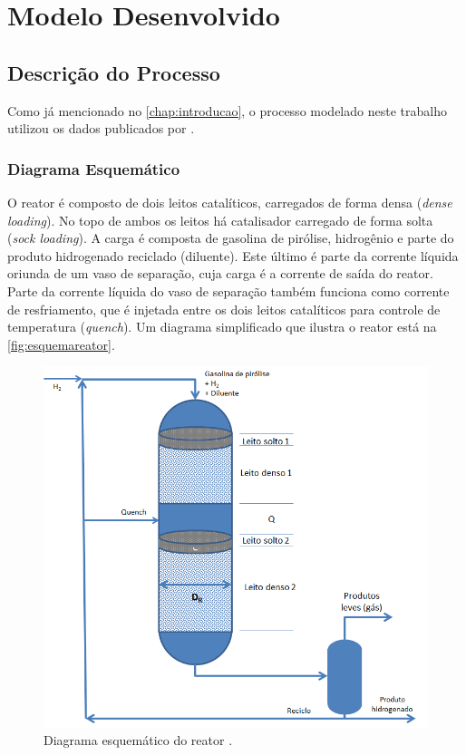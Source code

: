 %
\chapter{Modelo Desenvolvido}
\label{chap:moddesenvolvidos}

\section{Descrição do Processo} \label{sec:descricaoprocesso}

Como já mencionado no \autoref{chap:introducao}, o processo modelado
neste trabalho utilizou os dados publicados por . 

\subsection{Diagrama Esquemático} \label{sec:diagramaesquematico}

O reator é composto de dois leitos catalíticos, carregados de forma
densa (\emph{dense loading}). No topo de ambos os leitos há catalisador carregado de
forma solta (\emph{sock loading}). A carga é composta de gasolina de pirólise,
hidrogênio e parte do produto hidrogenado reciclado (diluente). Este último é
parte da corrente líquida oriunda de um vaso de separação, cuja carga é a corrente de
saída do reator. Parte da corrente líquida do vaso de separação também funciona
como corrente de resfriamento, que é injetada entre os dois leitos catalíticos
para controle de temperatura (\emph{quench}). Um diagrama simplificado que
ilustra o reator está na \autoref{fig:esquemareator}.

\begin{figure}[htb]
\centering \includegraphics[scale=0.75]{images/Chap3/esquemareatorb.png}
\caption{Diagrama esquemático do reator \cite{Rojas2014a}.}
\label{fig:esquemareator}
\end{figure}

